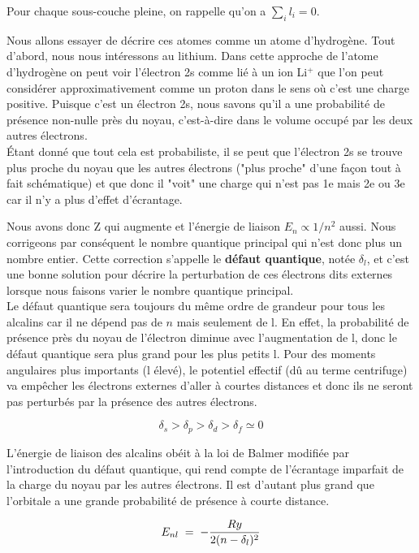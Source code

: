 Pour chaque sous-couche pleine, on rappelle qu'on a $\sum_i l_i = 0$.

Nous allons essayer de décrire ces atomes comme un atome d'hydrogène. Tout d'abord, nous nous intéressons au lithium. Dans cette approche de l'atome d'hydrogène on peut voir l'électron 2s comme lié à un ion Li$^{+}$ que l'on peut considérer approximativement comme un proton dans le sens où c'est une charge positive. Puisque c'est un électron 2s, nous savons qu'il a une probabilité de présence non-nulle près du noyau, c'est-à-dire dans le volume occupé par les deux autres électrons.\\  


Étant donné que tout cela est probabiliste, il se peut que l'électron 2s se trouve plus proche du noyau que les autres électrons ("plus proche" d'une façon tout à fait schématique) et que donc il "voit" une charge qui n'est pas 1e mais 2e ou 3e car il n'y a plus d'effet d'écrantage.

Nous avons donc Z qui augmente et l'énergie de liaison $E_n \propto 1/n^2$ aussi. Nous corrigeons par conséquent le nombre quantique principal qui n'est donc plus un nombre entier. Cette correction s’appelle le \textbf{défaut quantique}, notée $\delta_l$, et c’est une bonne solution pour décrire la perturbation de ces électrons dits externes lorsque nous faisons varier le nombre quantique principal.\\
Le défaut quantique sera toujours du même ordre de grandeur pour tous les alcalins car il ne dépend pas de $n$ mais seulement de l. En effet, la probabilité de présence près du noyau de l'électron diminue avec l'augmentation de l, donc le défaut quantique sera plus grand pour les plus petits l. Pour des moments angulaires plus importants (l élevé), le potentiel effectif (dû au terme centrifuge) va empêcher les électrons externes d’aller à courtes distances et donc ils ne seront pas perturbés par la présence des autres électrons.
 
 \[\delta_s>\delta_p>\delta_d>\delta_f\simeq 0\]
 
L'énergie de liaison des alcalins obéit à la loi de Balmer modifiée par l’introduction du défaut quantique, qui rend compte de l’écrantage imparfait de la charge du noyau par les autres électrons. Il est d’autant plus grand que l’orbitale a une grande probabilité de présence à courte distance.
 
\begin{equation}
    E_{nl} \; = \;  - \dfrac{Ry}{2(n-\delta_l)^2}
    \label{eq:def_quant}
\end{equation}
 
